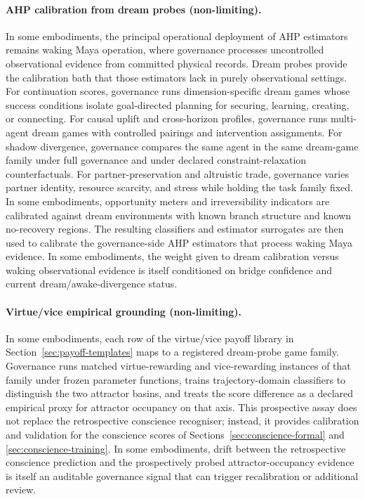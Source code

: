 \documentclass[a4paper,12pt]{article}
\begin{document}
\paragraph{AHP calibration from dream probes (non-limiting).}
In some embodiments, the principal operational deployment of AHP
estimators remains waking Maya operation, where governance processes
uncontrolled observational evidence from committed physical records.
Dream probes provide the calibration bath that those estimators lack in
purely observational settings. For continuation scores, governance runs
dimension-specific dream games whose success conditions isolate
goal-directed planning for securing, learning, creating, or connecting.
For causal uplift and cross-horizon profiles, governance runs
multi-agent dream games with controlled pairings and intervention
assignments. For shadow divergence, governance compares the same agent
in the same dream-game family under full governance and under declared
constraint-relaxation counterfactuals. For partner-preservation and
altruistic trade, governance varies partner identity, resource
scarcity, and stress while holding the task family fixed. In some
embodiments, opportunity meters and irreversibility indicators are
calibrated against dream environments with known branch structure and
known no-recovery regions. The resulting classifiers and estimator
surrogates are then used to calibrate the governance-side AHP
estimators that process waking Maya evidence. In some embodiments, the
weight given to dream calibration versus waking observational evidence
is itself conditioned on bridge confidence and current
dream/awake-divergence status.

\paragraph{Virtue/vice empirical grounding (non-limiting).}
In some embodiments, each row of the virtue/vice payoff library in
Section~\ref{sec:payoff-templates} maps to a registered dream-probe
game family. Governance runs matched virtue-rewarding and
vice-rewarding instances of that family under frozen parameter
functions, trains trajectory-domain classifiers to distinguish the two
attractor basins, and treats the score difference as a declared empirical proxy
for attractor occupancy on that axis. This prospective assay
does not replace the retrospective conscience recogniser; instead, it
provides calibration and validation for the conscience scores of
Sections~\ref{sec:conscience-formal} and
\ref{sec:conscience-training}. In some embodiments, drift between the
retrospective conscience prediction and the prospectively probed
attractor-occupancy evidence is itself an auditable governance
signal that can trigger
recalibration or additional review.
\end{document}
